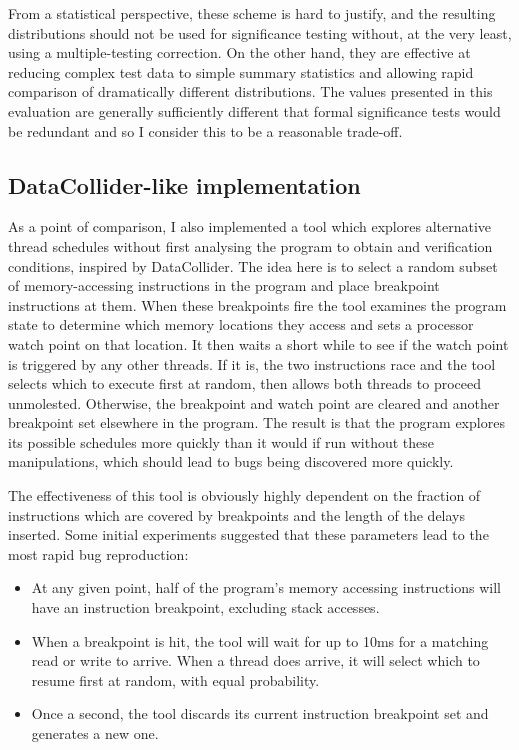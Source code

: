 From a statistical perspective, these scheme is hard to justify, and
the resulting distributions should not be used for significance
testing without, at the very least, using a multiple-testing
correction.  On the other hand, they are effective at reducing complex
test data to simple summary statistics and allowing rapid comparison
of dramatically different distributions.  The values presented in this
evaluation are generally sufficiently different that formal
significance tests would be redundant and so I consider this to be a
reasonable trade-off.


\subsection{DataCollider-like implementation}
\label{sect:eval:datacollider}

As a point of comparison, I also implemented a tool which explores
alternative thread schedules without first analysing the program to
obtain {\StateMachines} and verification conditions, inspired by
DataCollider\needCite{}.  The idea here is to select a random subset
of memory-accessing instructions in the program and place breakpoint
instructions at them.  When these breakpoints fire the tool examines
the program state to determine which memory locations they access and
sets a processor watch point\needCite{} on that location.  It then
waits a short while to see if the watch point is triggered by any
other threads.  If it is, the two instructions race and the tool
selects which to execute first at random, then allows both threads to
proceed unmolested.  Otherwise, the breakpoint and watch point are
cleared and another breakpoint set elsewhere in the program.  The
result is that the program explores its possible schedules more
quickly than it would if run without these manipulations, which should
lead to bugs being discovered more quickly.

The effectiveness of this tool is obviously highly dependent on the
fraction of instructions which are covered by breakpoints and the
length of the delays inserted.  Some initial experiments suggested
that these parameters lead to the most rapid bug
reproduction:

\begin{itemize}
\item
  At any given point, half of the program's memory accessing
  instructions will have an instruction breakpoint, excluding stack
  accesses.
\item
  When a breakpoint is hit, the tool will wait for up to 10ms for a
  matching read or write to arrive.  When a thread does arrive, it
  will select which to resume first at random, with equal probability.
\item
  Once a second, the tool discards its current instruction breakpoint
  set and generates a new one.
\end{itemize}

